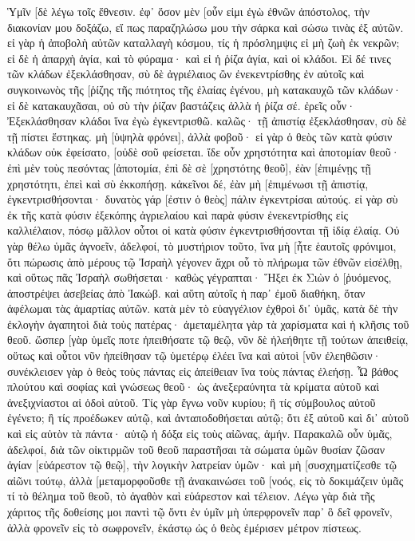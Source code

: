 Ὑμῖν [δὲ λέγω τοῖς ἔθνεσιν. ἐφ᾽ ὅσον μὲν [οὖν εἰμι ἐγὼ ἐθνῶν ἀπόστολος, τὴν διακονίαν μου δοξάζω, 
εἴ πως παραζηλώσω μου τὴν σάρκα καὶ σώσω τινὰς ἐξ αὐτῶν. 
εἰ γὰρ ἡ ἀποβολὴ αὐτῶν καταλλαγὴ κόσμου, τίς ἡ πρόσλημψις εἰ μὴ ζωὴ ἐκ νεκρῶν; 
εἰ δὲ ἡ ἀπαρχὴ ἁγία, καὶ τὸ φύραμα· καὶ εἰ ἡ ῥίζα ἁγία, καὶ οἱ κλάδοι. 
Εἰ δέ τινες τῶν κλάδων ἐξεκλάσθησαν, σὺ δὲ ἀγριέλαιος ὢν ἐνεκεντρίσθης ἐν αὐτοῖς καὶ συγκοινωνὸς τῆς [ῥίζης τῆς πιότητος τῆς ἐλαίας ἐγένου, 
μὴ κατακαυχῶ τῶν κλάδων· εἰ δὲ κατακαυχᾶσαι, οὐ σὺ τὴν ῥίζαν βαστάζεις ἀλλὰ ἡ ῥίζα σέ. 
ἐρεῖς οὖν· Ἐξεκλάσθησαν κλάδοι ἵνα ἐγὼ ἐγκεντρισθῶ. 
καλῶς· τῇ ἀπιστίᾳ ἐξεκλάσθησαν, σὺ δὲ τῇ πίστει ἕστηκας. μὴ [ὑψηλὰ φρόνει], ἀλλὰ φοβοῦ· 
εἰ γὰρ ὁ θεὸς τῶν κατὰ φύσιν κλάδων οὐκ ἐφείσατο, [οὐδὲ σοῦ φείσεται. 
ἴδε οὖν χρηστότητα καὶ ἀποτομίαν θεοῦ· ἐπὶ μὲν τοὺς πεσόντας [ἀποτομία, ἐπὶ δὲ σὲ [χρηστότης θεοῦ], ἐὰν [ἐπιμένῃς τῇ χρηστότητι, ἐπεὶ καὶ σὺ ἐκκοπήσῃ. 
κἀκεῖνοι δέ, ἐὰν μὴ [ἐπιμένωσι τῇ ἀπιστίᾳ, ἐγκεντρισθήσονται· δυνατὸς γάρ [ἐστιν ὁ θεὸς] πάλιν ἐγκεντρίσαι αὐτούς. 
εἰ γὰρ σὺ ἐκ τῆς κατὰ φύσιν ἐξεκόπης ἀγριελαίου καὶ παρὰ φύσιν ἐνεκεντρίσθης εἰς καλλιέλαιον, πόσῳ μᾶλλον οὗτοι οἱ κατὰ φύσιν ἐγκεντρισθήσονται τῇ ἰδίᾳ ἐλαίᾳ. 
Οὐ γὰρ θέλω ὑμᾶς ἀγνοεῖν, ἀδελφοί, τὸ μυστήριον τοῦτο, ἵνα μὴ [ἦτε ἑαυτοῖς φρόνιμοι, ὅτι πώρωσις ἀπὸ μέρους τῷ Ἰσραὴλ γέγονεν ἄχρι οὗ τὸ πλήρωμα τῶν ἐθνῶν εἰσέλθῃ, 
καὶ οὕτως πᾶς Ἰσραὴλ σωθήσεται· καθὼς γέγραπται· Ἥξει ἐκ Σιὼν ὁ [ῥυόμενος, ἀποστρέψει ἀσεβείας ἀπὸ Ἰακώβ. 
καὶ αὕτη αὐτοῖς ἡ παρ᾽ ἐμοῦ διαθήκη, ὅταν ἀφέλωμαι τὰς ἁμαρτίας αὐτῶν. 
κατὰ μὲν τὸ εὐαγγέλιον ἐχθροὶ δι᾽ ὑμᾶς, κατὰ δὲ τὴν ἐκλογὴν ἀγαπητοὶ διὰ τοὺς πατέρας· 
ἀμεταμέλητα γὰρ τὰ χαρίσματα καὶ ἡ κλῆσις τοῦ θεοῦ. 
ὥσπερ [γὰρ ὑμεῖς ποτε ἠπειθήσατε τῷ θεῷ, νῦν δὲ ἠλεήθητε τῇ τούτων ἀπειθείᾳ, 
οὕτως καὶ οὗτοι νῦν ἠπείθησαν τῷ ὑμετέρῳ ἐλέει ἵνα καὶ αὐτοὶ [νῦν ἐλεηθῶσιν· 
συνέκλεισεν γὰρ ὁ θεὸς τοὺς πάντας εἰς ἀπείθειαν ἵνα τοὺς πάντας ἐλεήσῃ. 
Ὦ βάθος πλούτου καὶ σοφίας καὶ γνώσεως θεοῦ· ὡς ἀνεξεραύνητα τὰ κρίματα αὐτοῦ καὶ ἀνεξιχνίαστοι αἱ ὁδοὶ αὐτοῦ. 
Τίς γὰρ ἔγνω νοῦν κυρίου; ἢ τίς σύμβουλος αὐτοῦ ἐγένετο; 
ἢ τίς προέδωκεν αὐτῷ, καὶ ἀνταποδοθήσεται αὐτῷ; 
ὅτι ἐξ αὐτοῦ καὶ δι᾽ αὐτοῦ καὶ εἰς αὐτὸν τὰ πάντα· αὐτῷ ἡ δόξα εἰς τοὺς αἰῶνας, ἀμήν. 
Παρακαλῶ οὖν ὑμᾶς, ἀδελφοί, διὰ τῶν οἰκτιρμῶν τοῦ θεοῦ παραστῆσαι τὰ σώματα ὑμῶν θυσίαν ζῶσαν ἁγίαν [εὐάρεστον τῷ θεῷ], τὴν λογικὴν λατρείαν ὑμῶν· 
καὶ μὴ [συσχηματίζεσθε τῷ αἰῶνι τούτῳ, ἀλλὰ [μεταμορφοῦσθε τῇ ἀνακαινώσει τοῦ [νοός, εἰς τὸ δοκιμάζειν ὑμᾶς τί τὸ θέλημα τοῦ θεοῦ, τὸ ἀγαθὸν καὶ εὐάρεστον καὶ τέλειον. 
Λέγω γὰρ διὰ τῆς χάριτος τῆς δοθείσης μοι παντὶ τῷ ὄντι ἐν ὑμῖν μὴ ὑπερφρονεῖν παρ᾽ ὃ δεῖ φρονεῖν, ἀλλὰ φρονεῖν εἰς τὸ σωφρονεῖν, ἑκάστῳ ὡς ὁ θεὸς ἐμέρισεν μέτρον πίστεως. 
